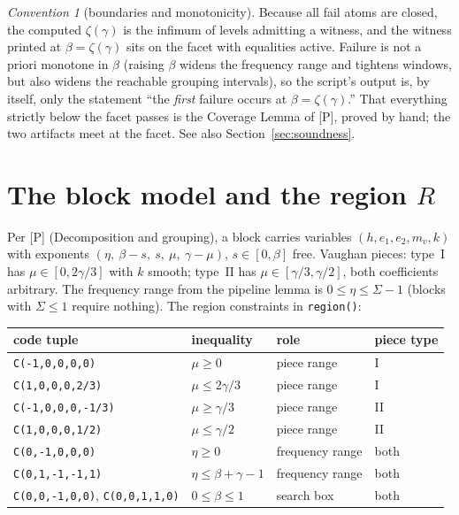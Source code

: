 \documentclass[11pt]{article}
\theoremstyle{remark}
\newtheorem{convention}[lemma]{Convention}
\newcommand{\code}[1]{\texttt{#1}}
\begin{document}
\begin{convention}[boundaries and monotonicity]\label{conv:boundary}
Because all fail atoms are closed, the computed $\zeta(\gamma)$ is the
infimum of levels admitting a witness, and the witness printed at
$\beta=\zeta(\gamma)$ sits on the facet with equalities active.
Failure is not a priori monotone in $\beta$ (raising $\beta$ widens the
frequency range and tightens windows, but also widens the reachable
grouping intervals), so the script's output is, by itself, only the
statement ``the \emph{first} failure occurs at $\beta=\zeta(\gamma)$.''
That everything strictly below the facet passes is the Coverage Lemma of
[P], proved by hand; the two artifacts meet at the facet. See also
Section~\ref{sec:soundness}.
\end{convention}

\section{The block model and the region $R$}\label{sec:region}

Per [P] (Decomposition and grouping), a block carries variables
$(h,e_1,e_2,m_v,k)$ with exponents
$(\eta,\ \beta-s,\ s,\ \mu,\ \gamma-\mu)$, $s\in[0,\beta]$ free. Vaughan
pieces: type~I has $\mu\in[0,2\gamma/3]$ with $k$ smooth; type~II has
$\mu\in[\gamma/3,\gamma/2]$, both coefficients arbitrary. The frequency
range from the pipeline lemma is $0\le\eta\le\Sigma-1$ (blocks with
$\Sigma\le1$ require nothing). The region constraints in
\code{region()}:
\begin{center}
\begin{tabular}{@{}llll@{}}
\toprule
code tuple & inequality & role & piece type\\
\midrule
\code{C(-1,0,0,0,0)} & $\mu\ge0$ & piece range & I\\
\code{C(1,0,0,0,2/3)} & $\mu\le 2\gamma/3$ & piece range & I\\
\code{C(-1,0,0,0,-1/3)} & $\mu\ge\gamma/3$ & piece range & II\\
\code{C(1,0,0,0,1/2)} & $\mu\le\gamma/2$ & piece range & II\\
\code{C(0,-1,0,0,0)} & $\eta\ge0$ & frequency range & both\\
\code{C(0,1,-1,-1,1)} & $\eta\le\beta+\gamma-1$ & frequency range & both\\
\code{C(0,0,-1,0,0)}, \code{C(0,0,1,1,0)} & $0\le\beta\le1$ & search box & both\\
\bottomrule
\end{tabular}
\end{center}
\end{document}
